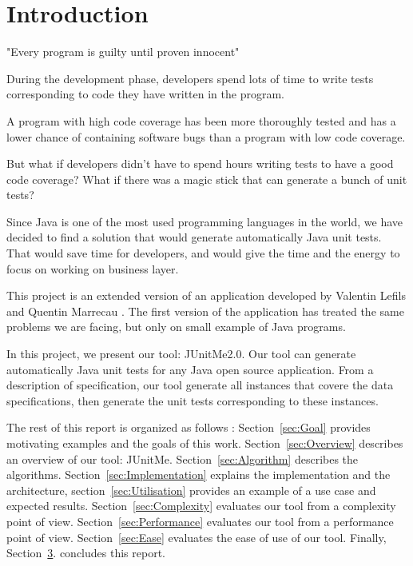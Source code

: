 \chapter*{Introduction}
	\thispagestyle{introduction}
	"Every program is guilty until proven innocent"
	
	During the development phase, developers spend lots of time to write tests corresponding to code they have written in the program.
	
	A program with high code coverage has been more thoroughly tested and has a lower chance of containing software bugs than a program with low code coverage.\cite{CodeCoverage}
	
	But what if developers didn't have to spend hours writing tests to have a good code coverage? What if there was a magic stick that can generate a bunch of unit tests? 
	
Since Java is one of the most used programming languages in the world, we have decided to find a solution that would generate automatically Java unit tests. That would save time for developers, and would give the time and the energy to focus on working on business layer.

This project is an extended version of an application developed by Valentin Lefils and Quentin Marrecau \cite{JUnitMeRapport} \cite{JUnitMeGitHub} . The first version of the application has treated the same problems we are facing, but only on small example of Java programs.

In this project, we present our tool: JUnitMe2.0. Our tool can generate automatically Java unit tests for any Java open source application. From a description of specification, our tool generate all instances that covere the data specifications, then generate the unit tests corresponding to these instances.
  
The rest of this report is organized as follows : Section~\ref{sec:Goal} provides motivating examples and the goals of this work.
Section~\ref{sec:Overview} describes an overview of our tool: JUnitMe.
Section~\ref{sec:Algorithm} describes the algorithms. Section~\ref{sec:Implementation} explains the implementation and the architecture, section~\ref{sec:Utilisation} provides an example of a use case and expected results.
Section~\ref{sec:Complexity} evaluates our tool from a complexity point of view. Section~\ref{sec:Performance} evaluates our tool from a performance point of view. Section~\ref{sec:Ease} evaluates the ease of use of our tool.
Finally, Section~\hyperref[ch:Conclusion]{3}. concludes this report.